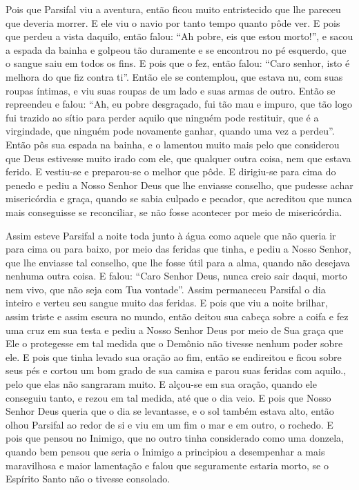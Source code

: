 Pois que Parsifal viu a aventura, então ficou muito entristecido que lhe
pareceu que deveria morrer. E ele viu o navio por tanto tempo quanto pôde ver.
E pois que perdeu a vista daquilo, então falou: “Ah pobre, eis que estou
morto!”, e sacou a espada da bainha e golpeou tão duramente e se encontrou no
pé esquerdo, que o sangue saiu em todos os fins. E pois que o fez, então falou:
“Caro senhor, isto é melhora do que fiz contra ti”. Então ele se contemplou,
que estava nu, com suas roupas íntimas, e viu suas roupas de um lado e suas
armas de outro. Então se repreendeu e falou: “Ah, eu pobre desgraçado, fui tão
mau e impuro, que tão logo fui trazido ao sítio para perder aquilo que ninguém
pode restituir, que é a virgindade, que ninguém pode novamente ganhar, quando
uma vez a perdeu”.  Então pôs sua espada na bainha, e o lamentou muito
mais pelo que considerou que Deus estivesse muito irado com ele, que qualquer
outra coisa, nem que estava ferido. E vestiu-se e preparou-se o melhor que
pôde. E dirigiu-se para cima do penedo e pediu a Nosso Senhor Deus que lhe
enviasse conselho, que pudesse achar misericórdia e graça, quando se sabia
culpado e pecador, que acreditou que nunca mais conseguisse se reconciliar, se
não fosse acontecer por meio de misericórdia. 

Assim esteve Parsifal a noite toda junto à água como aquele que não queria
ir para cima ou para baixo, por meio das feridas que tinha, e pediu a Nosso
Senhor, que lhe enviasse tal conselho, que lhe fosse útil para a alma, quando
não desejava nenhuma outra coisa. E falou: “Caro Senhor Deus, nunca creio sair
daqui, morto nem vivo, que não seja com Tua vontade”.  Assim permaneceu
Parsifal o dia inteiro e verteu seu sangue muito das feridas. E pois que viu a
noite brilhar, assim triste e assim escura no mundo, então deitou sua cabeça
sobre a coifa e fez uma cruz em sua testa e pediu a Nosso Senhor Deus por meio
de Sua graça que Ele o protegesse em tal medida que o Demônio não tivesse
nenhum poder sobre ele. E pois que tinha levado sua oração ao fim, então se
endireitou e ficou sobre seus pés e cortou um bom grado de sua camisa e parou
suas feridas com aquilo.,  pelo que elas não sangraram muito. E alçou-se em sua
oração, quando ele conseguiu tanto, e rezou em tal medida, até que o dia veio.
E pois que Nosso Senhor Deus queria que o dia se levantasse, e o sol também
estava alto, então olhou Parsifal ao redor de si e viu em um fim o mar e em
outro, o rochedo. E pois que pensou no Inimigo, que no outro tinha considerado
como uma donzela, quando bem pensou que seria o Inimigo a principiou a
desempenhar a mais maravilhosa e maior lamentação e falou que seguramente
estaria morto, se o Espírito Santo não o tivesse consolado.

